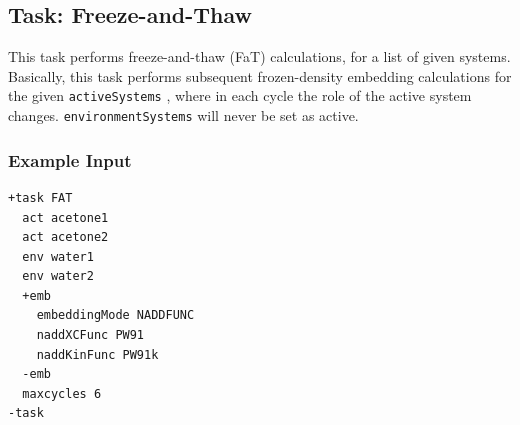 \documentclass[bibliography=totocnumbered,a4paper,10pt,oneside]{scrbook}
\newcommand{\ttt}[1]{%
  \begingroup\setlength{\fboxsep}{1pt}%
  \colorbox{serenity-green!30}{\texttt{\hspace*{2pt}\vphantom{(g}#1\hspace*{2pt}}}%
  \endgroup
}
\begin{document}
\subsection{Task: Freeze-and-Thaw}
\label{sec:FAT}
This task performs freeze-and-thaw (FaT) calculations, for a list of given systems. Basically, this task
performs subsequent frozen-density embedding calculations for the given \ttt{activeSystems}, where in each
cycle the role of the active system changes. \ttt{environmentSystems} will never be set as active.
\subsubsection{Example Input}
\begin{lstlisting}
+task FAT
  act acetone1
  act acetone2
  env water1
  env water2
  +emb
    embeddingMode NADDFUNC
    naddXCFunc PW91
    naddKinFunc PW91k
  -emb
  maxcycles 6
-task
\end{lstlisting}
\end{document}
